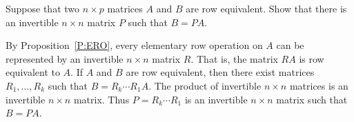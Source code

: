 \documentclass{ximera}
\begin{document}
\begin{exercise}  \label{c10.1.c8} 
Suppose that two $n\times p$ matrices $A$ and $B$ are row
equivalent.  Show that there is an invertible
$n\times n$ matrix $P$ such that $B = PA$.

\begin{solution}

By Proposition~\ref{P:ERO}, every
elementary row operation on $A$ can be represented by an invertible $n
\times n$ matrix $R$.  That is, the matrix $RA$ is row equivalent to
$A$.  If $A$ and $B$ are row equivalent, then there exist matrices
$R_1,\ldots,R_k$ such that $B = R_k\cdots R_1A$.  The product of invertible $n
\times n$ matrices is an invertible $n \times n$ matrix.  Thus $P =
R_k\cdots R_1$ is an invertible $n \times n$ matrix such that $B =
PA$.

\end{solution}
\end{exercise}
\end{document}
